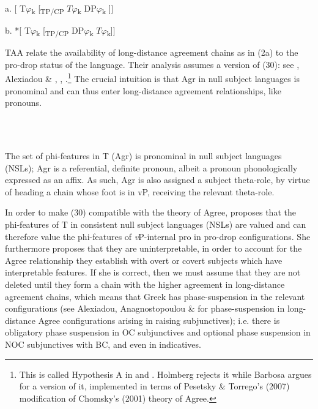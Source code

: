 \documentclass[output=paper]{langsci/langscibook}
\begin{document}
           a.  [   T$\varphi $\textsubscript{k} [\textsubscript{TP/CP}    $T\varphi $\textsubscript{k}    DP$\varphi $\textsubscript{k}  ]]      

  b.  *[ T$\varphi $\textsubscript{k} [\textsubscript{TP/CP}  DP$\varphi $\textsubscript{k}   $T\varphi $\textsubscript{k}]]

TAA relate the availability of long-distance agreement chains as in (2a) to the pro-drop status of the language. Their analysis assumes a version of (30): see \citet{Rizzi1982}, Alexiadou \& \citet{Anagnostopoulou1998}, \citet{Holmberg2005}, \citet{Barbosa2009}.\footnote{This is called Hypothesis A in \citet{Holmberg2005} and \citet{Barbosa2009}. Holmberg rejects it while Barbosa argues for a version of it, implemented in terms of Pesetsky \& Torrego’s (2007) modification of Chomsky’s (2001) theory of Agree.} The crucial intuition is that Agr in null subject languages is pronominal and can thus enter long-distance agreement relationships, like pronouns.

\ea%
    \label{ex:key:30}
    \gll\\
        \\
    \glt
    \z

          The set of phi-features in T (Agr) is pronominal in null subject languages (NSLs); Agr is a referential, definite pronoun, albeit a pronoun phonologically expressed as an affix. As such, Agr is also assigned a subject theta-role, by virtue of heading a chain whose foot is in vP, receiving the relevant theta-role.

In order to make (30) compatible with the theory of Agree, \citet{Barbosa2009} proposes that the phi-features of T in consistent null subject languages (NSLs) are valued and can therefore value the phi-features of \textit{v}P-internal pro in pro-drop configurations. She furthermore proposes that they are uninterpretable, in order to account for the Agree relationship they establish with overt or covert subjects which have interpretable features. If she is correct, then we must assume that they are not deleted until they form a chain with the higher agreement in long-distance agreement chains, which means that Greek has phase-suspension in the relevant configurations (see Alexiadou, Anagnostopoulou \& \citealt{Wurmbrand2014} for phase-suspension in long-distance Agree configurations arising in raising subjunctives); i.e. there is obligatory phase suspension in OC subjunctives and optional phase suspension in NOC subjunctives with BC, and even in indicatives.  
\end{document}
